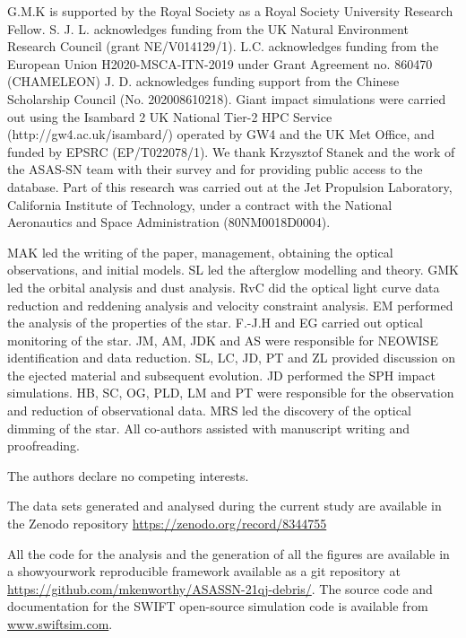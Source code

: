 \documentclass[sn-nature]{sn-jnl}%
\begin{document}
G.M.K is supported by the Royal Society as a Royal Society University Research Fellow.
%
S. J. L. acknowledges funding from the UK Natural Environment Research Council (grant NE/V014129/1).
%
L.C. acknowledges funding from the European Union H2020-MSCA-ITN-2019 under Grant Agreement no. 860470 (CHAMELEON)
%
J. D. acknowledges funding support from the Chinese Scholarship Council (No. 202008610218). Giant impact simulations were carried out using the Isambard 2 UK National Tier-2 HPC Service (http://gw4.ac.uk/isambard/) operated by GW4 and the UK Met Office, and funded by EPSRC (EP/T022078/1).
%
We thank Krzysztof Stanek and the work of the ASAS-SN team with their survey and for providing public access to the database.
%
Part of this research was carried out at the Jet Propulsion Laboratory, California Institute of Technology, under a contract with the National Aeronautics and Space Administration (80NM0018D0004).

MAK led the writing of the paper, management, obtaining the optical observations, and initial models.
%
SL led the afterglow modelling and theory.
%
GMK led the orbital analysis and dust analysis.
%
RvC did the optical light curve data reduction and reddening analysis and velocity constraint analysis.
%
EM performed the analysis of the properties of the star.
%
F.-J.H and EG carried out optical monitoring of the star.
%
JM, AM, JDK and AS were responsible for NEOWISE identification and data reduction.
%
SL, LC, JD, PT and ZL provided discussion on the ejected material and subsequent evolution.
%
JD performed the SPH impact simulations.
%
HB, SC, OG, PLD, LM and PT were responsible for the observation and reduction of observational data.
%
MRS led the discovery of the optical dimming of the star.
%
All co-authors assisted with manuscript writing and proofreading.

 The authors declare no competing interests.

The data sets generated and analysed during the current study are available in the Zenodo repository \url{https://zenodo.org/record/8344755}

All the code for the analysis and the generation of all the figures  are available in a showyourwork \citep{Luger2021} reproducible framework available as a git repository at \url{https://github.com/mkenworthy/ASASSN-21qj-debris/}.
%
The source code and documentation for the SWIFT open-source simulation code is available from \url{www.swiftsim.com}.
\end{document}
